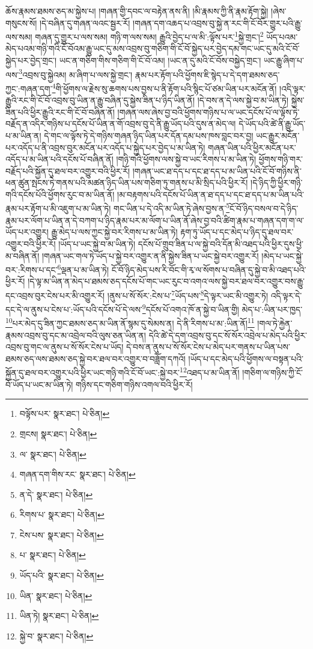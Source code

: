 ཆོས་རྣམས་ཐམས་ཅད་མ་སྐྱེས་པ། །གཞན་གྱི་དབང་ལ་བརྟེན་ནས་ནི། །མི་རྣམས་ཀྱི་ནི་རྣམ་རྟོག་སྐྱེ། །ཞེས་གསུངས་སོ། །དེ་བཞིན་དུ་གཞན་ལའང་སྦྱར་རོ། །གཞན་དག་འཆད་པ་འབྲས་བུ་སྐྱེ་ན་རང་གི་ངོ་བོར་གྱུར་པའི་རྒྱུ་ལས་སམ། གཞན་དུ་གྱུར་པ་ལས་སམ། གཉི་ག་ལས་སམ། རྒྱུའི་བྱེད་པ་ལ་མི་:ལྟོས་པར་\footnote{བལྟོས་པར་  སྣར་ཐང་།  པེ་ཅིན། }སྐྱེ་གྲང་།\footnote{གྲངས།  སྣར་ཐང་།  པེ་ཅིན། } ཡོད་པའམ་མེད་པའམ་གཉི་གའི་ངོ་བོའམ་རྒྱུ་ཡང་དུ་མས་འབྲས་བུ་གཅིག་གི་ངོ་བོ་སྐྱེད་པར་བྱེད་དམ་གང་ཡང་དུ་མའི་ངོ་བོ་སྐྱེད་པར་བྱེད་གྲང་། ཡང་ན་གཅིག་གིས་གཅིག་གི་ངོ་བོ་འམ། །ཡང་ན་དུ་མའི་ངོ་བོས་བསྐྱེད་གྲང་། ཡང་རྒྱུ་ཞིག་པ་ལས་\footnote{ལ་  སྣར་ཐང་།  པེ་ཅིན། }འབྲས་བུ་སྐྱེའམ། མ་ཞིག་པ་ལས་སྐྱེ་གྲང་། རྣམ་པར་རྟོག་པའི་ཕྱོགས་ཇི་སྙེད་པ་དེ་དག་ཐམས་ཅད་ཀྱང་:གཞན་དག་\footnote{གཞན་དག་གིས་རང་  སྣར་ཐང་།  པེ་ཅིན། }གི་ཕྱོགས་ལ་རྗེས་སུ་ཆགས་པས་བྱས་པ་ནི་རྟོག་པའི་སྙིང་པོ་ཙམ་ཡིན་པར་མངོན་ནོ། །འདི་ལྟར་རྒྱུའི་རང་གི་ངོ་བོ་འབྲས་བུ་ཡིན་ན་རྒྱུ་བཞིན་དུ་སྐྱེས་ཟིན་པ་ཉིད་ཡིན་ནོ། །དེ་བས་ན་དེ་ལས་སྐྱེ་བ་མ་ཡིན་ཏེ། སྐྱེས་ཟིན་པའི་ཕྱིར་རྒྱུའི་རང་གི་ངོ་བོ་བཞིན་ནོ། །གཞན་ལས་ཞེས་བྱ་བའི་ཕྱོགས་གཉིས་པ་ལ་ཡང་དངོས་པོ་ལ་ལྟོས་ཏེ་བརྗོད་ན་འདིར་གཉིས་པ་དངོས་པོ་ཡིན་ན་གོ་འབྲས་བུ་དེ་ནི་རྒྱུ་ཡོད་པའི་དུས་ན་མེད་ལ། དེ་ཡོད་པའི་ཚེ་ནི་རྒྱུ་ཡོད་པ་མ་ཡིན་ན། དེ་གང་ལ་ལྟོས་ཏེ་དེ་གཉིས་གཞན་ཉིད་ཡིན་པར་དོན་དམ་པས་ཁས་བླང་བར་བྱ། ཡང་རྒྱུར་མངོན་པར་འདོད་པ་ནི་འབྲས་བུར་མངོན་པར་འདོད་པ་སྐྱེད་པར་བྱེད་པ་མ་ཡིན་ཏེ། གཞན་ཡིན་པའི་ཕྱིར་མངོན་པར་འདོད་པ་མ་ཡིན་པའི་དངོས་པོ་བཞིན་ནོ། །གཉི་གའི་ཕྱོགས་ལས་སྐྱེ་བ་ཡང་རིགས་པ་མ་ཡིན་ཏེ། ཕྱོགས་གཉི་གར་བརྗོད་པའི་སྐྱོན་དུ་ཐལ་བར་འགྱུར་བའི་ཕྱིར་རོ། །གཞན་ཡང་ཐ་དད་པ་དང་ཐ་དད་པ་མ་ཡིན་པའི་ངོ་བོ་གཉིས་ནི་ཕན་ཚུན་སྤངས་ཏེ་གནས་པའི་མཚན་ཉིད་ཡིན་པས་གཅིག་ཏུ་གནས་པ་མི་སྲིད་པའི་ཕྱིར་རོ། །དེ་ཉིད་ཀྱི་ཕྱིར་གཉི་གའི་དངོས་པོའི་ཕྱོགས་རུང་བ་མ་ཡིན་ནོ། །མ་བརྟགས་པའི་དངོས་པོ་ཡིན་ན་ཐ་དད་པ་དང་ཐ་དད་པ་མ་ཡིན་པའི་རྣམ་པར་རྟོག་པ་མི་འཇུག་པ་མ་ཡིན་ཏེ། གང་ཡིན་པ་དེ་འདི་མ་ཡིན་ཏེ་ཞེས་བྱས་ན་\footnote{ན་དེ་  སྣར་ཐང་།  པེ་ཅིན། }ངོ་བོ་ཉིད་བསལ་བ་དེ་ཉིད་རྣམ་པར་ལོག་པ་ཡིན་ན་དེ་བཀག་པ་ཉིད་རྣམ་པར་མ་ལོག་པ་ཡིན་ནོ་ཞེས་བྱ་བའི་ཚིག་རྣམ་པ་གཞན་དག་ག་ལ་ཡོད་པར་འགྱུར། རྒྱུ་མེད་པ་ལས་ཀྱང་སྐྱེ་བར་རིགས་པ་མ་ཡིན་ཏེ། རྟག་ཏུ་ཡོད་པ་དང་མེད་པ་ཉིད་དུ་ཐལ་བར་འགྱུར་བའི་ཕྱིར་རོ། །ཡོད་པ་ཡང་སྐྱེ་བ་མ་ཡིན་ཏེ། དངོས་པོ་གྲུབ་ཟིན་པ་ལ་སྐྱེ་བའི་དོན་མི་འཐད་པའི་ཕྱིར་དུས་ཕྱི་མ་བཞིན་ནོ། །གཞན་ཡང་གལ་ཏེ་ཡོད་པ་སྐྱེ་བར་འགྱུར་ན་ནི་སྐྱེས་ཟིན་པ་ཡང་སྐྱེ་བར་འགྱུར་རོ། །མེད་པ་ཡང་སྐྱེ་བར་:རིགས་པ་དང་\footnote{རིགས་པ་  སྣར་ཐང་།  པེ་ཅིན། }ལྡན་པ་མ་ཡིན་ཏེ། ངོ་བོ་ཉིད་མེད་པས་རི་བོང་གི་རྭ་ལ་སོགས་པ་བཞིན་དུ་སྐྱེ་བ་མི་འཐད་པའི་ཕྱིར་རོ། །དེ་ལྟ་མ་ཡིན་ན་མེད་པ་ཐམས་ཅད་དངོས་པོ་གང་ཡང་རུང་བ་འགའ་ལས་སྐྱེ་བར་ཐལ་བར་འགྱུར་བས་རྒྱུ་དང་འབྲས་བུར་ངེས་པར་མི་འགྱུར་རོ། །ནུས་པ་སོ་སོར་:ངེས་པ་\footnote{ངེས་པས་  སྣར་ཐང་།  པེ་ཅིན། }ཡོད་པས་\footnote{པ་  སྣར་ཐང་།  པེ་ཅིན། }དེ་ལྟར་ཡང་མི་འགྱུར་ཏེ། འདི་ལྟར་དེ་དང་དེ་ལ་ནུས་པ་ངེས་པ་:ཡོད་པའི་དངོས་པོ་དེ་ལས་\footnote{ཡོད་པའི་  སྣར་ཐང་།  པེ་ཅིན། }དངོས་པོ་འགའ་ཁོ་ན་སྐྱེ་བ་ཡིན་གྱི། མེད་པ་:ཡིན་པར་ཁྱད་\footnote{ཡིན་  སྣར་ཐང་།  པེ་ཅིན། }པར་མེད་དུ་ཟིན་ཀྱང་ཐམས་ཅད་མ་ཡིན་ནོ་སྙམ་དུ་སེམས་ན། དེ་ནི་རིགས་པ་མ་:ཡིན་ནོ།\footnote{ཡིན་ཏེ།  སྣར་ཐང་།  པེ་ཅིན། } །གལ་ཏེ་རྐྱེན་རྣམས་འབྲས་བུ་དང་མ་འབྲེལ་བའི་ལུས་ཅན་ཡིན་ན། དེའི་ཚེ་དེ་དག་འབྲས་བུ་དང་སོ་སོར་འབྲེལ་པ་མེད་པའི་ཕྱིར་འབྲས་བུ་གང་ལ་ནུས་པ་སོ་སོར་ངེས་པ་ཡོད། དེ་བས་ན་ནུས་པ་སོ་སོར་ངེས་པ་མེད་པར་གནས་པ་ཡིན་པས་ཐམས་ཅད་ལས་ཐམས་ཅད་སྐྱེ་བར་ཐལ་བར་འགྱུར་བ་བཟློག་དཀའོ། །ཡོད་པ་དང་མེད་པའི་ཕྱོགས་ལ་བསྟན་པའི་སྐྱོན་དུ་ཐལ་བར་འགྱུར་པའི་ཕྱིར་ཡང་གཉི་གའི་ངོ་བོ་ཡང་:སྐྱེ་བར་\footnote{སྐྱེ་བ་  སྣར་ཐང་།  པེ་ཅིན། }འཐད་པ་མ་ཡིན་ནོ། །གཅིག་ལ་གཉིས་ཀྱི་ངོ་བོ་ཡོད་པ་ཡང་མ་ཡིན་ཏེ། གཉིས་དང་གཅིག་གཉིས་འགལ་བའི་ཕྱིར་རོ། 